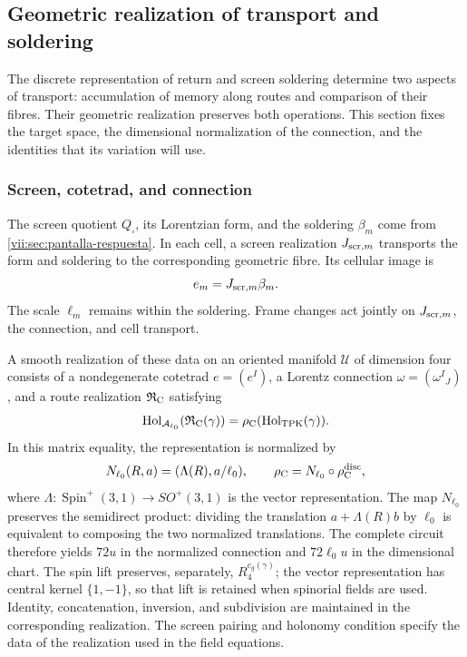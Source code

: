 
\subsection{Geometric realization of transport and soldering}
\label{vii:sec:realizacion-cartan}

The discrete representation of return and screen soldering
determine two aspects of transport: accumulation of memory along
routes and comparison of their fibres. Their geometric realization
preserves both operations. This section fixes the target
space, the dimensional normalization of the connection, and the identities
that its variation will use.

\subsubsection{Screen, cotetrad, and connection}

The screen quotient \(Q_\square\), its Lorentzian form, and the
soldering \(\beta_m\) come from
\ref{vii:sec:pantalla-respuesta}. In each cell, a screen
realization \(J_{{\rm scr},m}\) transports the form and soldering
to the corresponding geometric fibre. Its cellular image is
\[
 e_m=J_{{\rm scr},m}\beta_m.
\]
The scale \(\ell_m\) remains within the soldering. Frame
changes act jointly on \(J_{{\rm scr},m}\), the connection,
and cell transport.

A smooth realization of these data on an oriented manifold
\(\mathcal U\) of dimension four consists of a nondegenerate
cotetrad \(e=(e^I)\), a Lorentz connection
\(\omega=(\omega^I{}_J)\), and a route realization
\(\mathfrak R_{\rm C}\) satisfying
\begin{equation}
 \operatorname{Hol}_{\mathcal A_{\ell_0}}
       (\mathfrak R_{\rm C}(\gamma))
 =\rho_{\rm C}(\operatorname{Hol}_{\rm TPK}(\gamma)).
 \label{vii:eq:compatibilidad-holonomia-geometrica}
\end{equation}
In this matrix equality, the representation is normalized by
\[
 N_{\ell_0}(R,a)=(\Lambda(R),a/\ell_0),\qquad
 \rho_{\rm C}=N_{\ell_0}\circ\rho_{\rm C}^{\rm disc},
\]
where \(\Lambda:\operatorname{Spin}^+(3,1)\to SO^+(3,1)\)
is the vector representation. The map \(N_{\ell_0}\)
preserves the semidirect product: dividing the translation
\(a+\Lambda(R)b\) by \(\ell_0\) is equivalent to composing
the two normalized translations. The complete circuit therefore yields
\(72u\) in the normalized connection and \(72\ell_0u\) in the
dimensional chart. The spin lift preserves, separately,
\(R_4^{c_g(\gamma)}\); the vector representation has central
kernel \(\{1,-1\}\), so that lift is retained when
spinorial fields are used.
Identity, concatenation, inversion, and subdivision are maintained in the
corresponding realization. The screen pairing and holonomy condition
specify the data of the realization used in the field equations.

